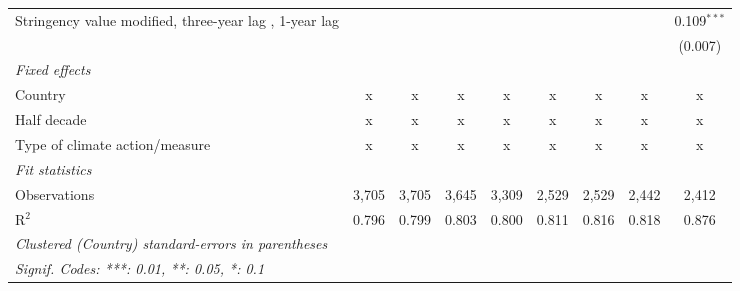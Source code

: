 \begin{table}[htbp]
\begin{tabular}{lcccccccc}
      Stringency value modified, three-year lag , 1-year lag                             &                &                &                &               &               &               &               & 0.109$^{***}$\\   
                                                                                         &                &                &                &               &               &               &               & (0.007)\\   
      \emph{Fixed effects}\\
      Country                                                                            & x              & x              & x              & x             & x             & x             & x             & x\\  
      Half decade                                                                        & x              & x              & x              & x             & x             & x             & x             & x\\  
      Type of climate action/measure                                                     & x              & x              & x              & x             & x             & x             & x             & x\\  
      \midrule \emph{Fit statistics}\\
      Observations                                                                       & 3,705          & 3,705          & 3,645          & 3,309         & 2,529         & 2,529         & 2,442         & 2,412\\  
      R$^2$                                                                              & 0.796          & 0.799          & 0.803          & 0.800         & 0.811         & 0.816         & 0.818         & 0.876\\  
      \midrule
      \multicolumn{9}{l}{\emph{Clustered (Country) standard-errors in parentheses}}\\
      \multicolumn{9}{l}{\emph{Signif. Codes: ***: 0.01, **: 0.05, *: 0.1}}\\
   \end{tabular}
\end{table}


